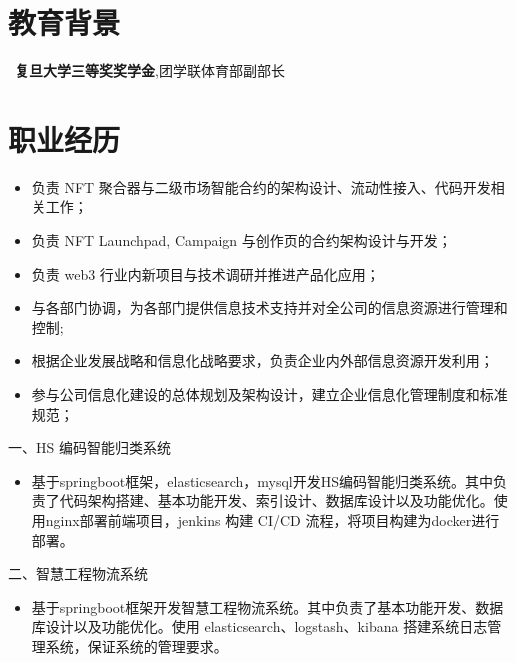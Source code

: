 \documentclass{resume}
\begin{document}



\section{教育背景}
\ \textbf{复旦大学三等奖奖学金},团学联体育部副部长

\section{职业经历}

\begin{itemize}[parsep=0.5ex]
  \item 负责 NFT 聚合器与二级市场智能合约的架构设计、流动性接入、代码开发相关工作；
  \item 负责 NFT Launchpad, Campaign 与创作页的合约架构设计与开发；
  \item 负责 web3 行业内新项目与技术调研并推进产品化应用；
\end{itemize}

\begin{itemize}[parsep=0.5ex]
  \item 与各部门协调，为各部门提供信息技术支持并对全公司的信息资源进行管理和控制;
  \item 根据企业发展战略和信息化战略要求，负责企业内外部信息资源开发利用；
  \item 参与公司信息化建设的总体规划及架构设计，建立企业信息化管理制度和标准规范；
\end{itemize}

一、HS 编码智能归类系统
\begin{itemize}[parsep=0.5ex]
  \item 基于springboot框架，elasticsearch，mysql开发HS编码智能归类系统。其中负责了代码架构搭建、基本功能开发、索引设计、数据库设计以及功能优化。使用nginx部署前端项目，jenkins 构建 CI/CD 流程，将项目构建为docker进行部署。
\end{itemize}
二、智慧工程物流系统
\begin{itemize}[parsep=0.5ex]
  \item 基于springboot框架开发智慧工程物流系统。其中负责了基本功能开发、数据库设计以及功能优化。使用 elasticsearch、logstash、kibana 搭建系统日志管理系统，保证系统的管理要求。
\end{itemize}
\end{document}
